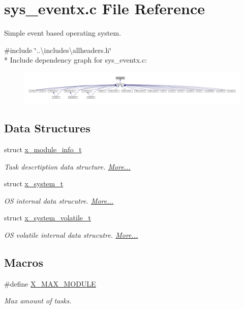 \hypertarget{a00037}{\section{sys\+\_\+eventx.\+c File Reference}
\label{a00037}
}


Simple event based operating system.  


{\ttfamily \#include \char`\"{}..\textbackslash{}includes\textbackslash{}allheaders.\+h\char`\"{}}\\*
Include dependency graph for sys\+\_\+eventx.\+c\+:\nopagebreak
\begin{figure}[H]
\begin{center}
\leavevmode
\includegraphics[width=350pt]{d1/db5/a01701}
\end{center}
\end{figure}
\subsection*{Data Structures}
\begin{DoxyCompactItemize}
\item 
struct \hyperlink{a00037_dc/d0a/a00850}{x\+\_\+module\+\_\+info\+\_\+t}
\begin{DoxyCompactList}\small\item\em Task descrtiption data structure.  \hyperlink{a00037_dc/d0a/a00850}{More...}\end{DoxyCompactList}\item 
struct \hyperlink{a00037_da/d98/a00870}{x\+\_\+system\+\_\+t}
\begin{DoxyCompactList}\small\item\em O\+S internal data strucutre.  \hyperlink{a00037_da/d98/a00870}{More...}\end{DoxyCompactList}\item 
struct \hyperlink{a00037_dd/de1/a00871}{x\+\_\+system\+\_\+volatile\+\_\+t}
\begin{DoxyCompactList}\small\item\em O\+S volatile internal data strucutre.  \hyperlink{a00037_dd/de1/a00871}{More...}\end{DoxyCompactList}\end{DoxyCompactItemize}
\subsection*{Macros}
\begin{DoxyCompactItemize}
\item 
\#define \hyperlink{a00037_a04282f21b2fb8a316c5d04a2dfd24eaa}{X\+\_\+\+M\+A\+X\+\_\+\+M\+O\+D\+U\+L\+E}
\begin{DoxyCompactList}\small\item\em Max amount of tasks. \end{DoxyCompactList}\end{DoxyCompactItemize}
